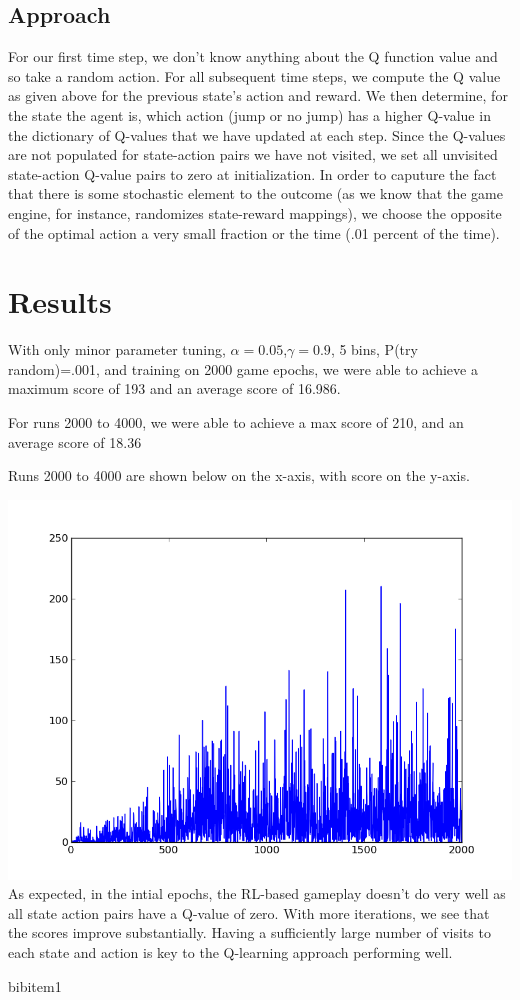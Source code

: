 \documentclass[11pt, oneside]{article}   	%
\begin{document}
\subsection*{Approach}

For our first time step, we don't know anything about the Q function value and so take a random action.
\newline
For all subsequent time steps, we compute the Q value as given above for the previous state's action and reward. We then determine, for the state the agent is, which action (jump or no jump) has a higher Q-value in the dictionary of Q-values that we have updated at each step.
\newline
Since the Q-values are not populated for state-action pairs we have not visited, we set all unvisited state-action Q-value pairs to zero at initialization.
\newline
In order to caputure the fact that there is some stochastic element to the outcome (as we know that the game engine, for instance, randomizes state-reward mappings), we choose the opposite of the optimal action a very small fraction or the time (.01 percent of the time).

\section*{Results}
With only minor parameter tuning, $\alpha = 0.05$,$\gamma = 0.9$, 5 bins, P(try random)=.001, and training on 2000 game epochs, we were able to achieve a maximum score of 193 and an average score of 16.986.

For runs 2000 to 4000, we were able to achieve a max score of 210, and an average score of 18.36
\newline

Runs 2000 to 4000 are shown below on the x-axis, with score on the y-axis.

\includegraphics[scale=.5]{graph2}
\newline
As expected, in the intial epochs, the RL-based gameplay doesn't do very well as all state action pairs have a Q-value of zero. With more iterations, we see that the scores improve substantially.
\newline
Having a sufficiently large number of visits to each state and action is key to the Q-learning approach performing well.

\begin{thebibliography}{1}

 bibitem1 
 
  \end{thebibliography}
\end{document}
